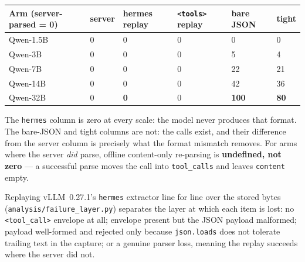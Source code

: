 \begin{center}
\begin{minipage}{\linewidth}
\centering
\small
{}\label{tab:reparse}
\begin{tabular}{@{}llllll@{}}
\toprule
Arm (server-parsed = 0) & server & hermes replay & \texttt{<tools>} replay & bare JSON & tight \\
\midrule
Qwen-1.5B & 0 & 0 & 0 & 0 & 0 \\
Qwen-3B & 0 & 0 & 0 & 5 & 4 \\
Qwen-7B & 0 & 0 & 0 & 22 & 21 \\
Qwen-14B & 0 & 0 & 0 & 42 & 36 \\
Qwen-32B & 0 & \textbf{0} & 0 & \textbf{100} & \textbf{80} \\
\bottomrule
\end{tabular}
\end{minipage}
\end{center}

The \texttt{hermes} column is zero at every scale: the model never produces that format. The
bare-JSON and tight columns are not: the calls exist, and their difference from the server
column is precisely what the format mismatch removes. For arms where the server \emph{did}
parse, offline content-only re-parsing is \textbf{undefined, not zero} --- a successful parse
moves the call into \texttt{tool\_calls} and leaves \texttt{content} empty.

Replaying vLLM~0.27.1's \texttt{hermes} extractor line for line over the stored bytes
(\texttt{analysis/failure\_layer.py}) separates the layer at which each item is lost: no
\texttt{<tool\_call>} envelope at all; envelope present but the JSON payload malformed; payload
well-formed and rejected only because \texttt{json.loads} does not tolerate trailing text in the
capture; or a genuine parser loss, meaning the replay succeeds where the server did not.

